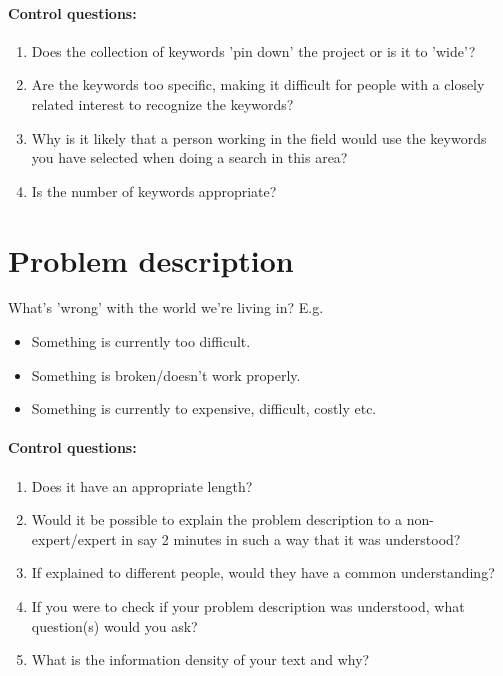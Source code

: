 \paragraph{Control questions:}
\begin{enumerate}
\item Does the collection of keywords 'pin down' the project or is it to 'wide'?
\item Are the keywords too specific, making it difficult  for people with a closely related interest to recognize the keywords?
\item Why is it likely that a person working in the field would use the keywords you have selected when doing a search in this area?
\item Is the number of keywords appropriate?
\end{enumerate}

\section{Problem description}
What's 'wrong' with the world we're living in? E.g.
\begin{itemize}
\item   Something is currently too difficult.
\item   Something is broken/doesn't work properly.
\item   Something is currently to expensive, difficult, costly etc.
\end{itemize}

\paragraph{Control questions:}
\begin{enumerate}
\item Does it have an appropriate length?
\item Would it be possible to explain the problem description to a non-expert/expert in say 2 minutes in such a way that it was understood?
\item If explained to different people, would they have a common understanding?
\item If you were to check if your problem description was understood, what question(s) would you ask?
\item What is the information density of your text and why?
\end{enumerate}

